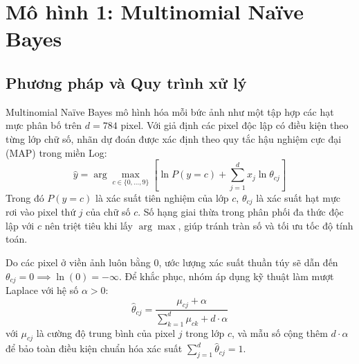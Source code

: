 \documentclass[11pt,a4paper]{article}
\begin{document}
\section{Mô hình 1: Multinomial Naïve Bayes}

\subsection{Phương pháp và Quy trình xử lý}
Multinomial Naïve Bayes mô hình hóa mỗi bức ảnh như một tập hợp các hạt mực phân bố trên $d = 784$ pixel. Với giả định các pixel độc lập có điều kiện theo từng lớp chữ số, nhãn dự đoán được xác định theo quy tắc hậu nghiệm cực đại (MAP) trong miền Log:
\begin{equation}
    \hat{y} = \arg\max_{c \in \{0, \dots, 9\}} \left[ \ln P(y = c) + \sum_{j=1}^d x_j \ln \theta_{cj} \right]
\end{equation}
Trong đó $P(y = c)$ là xác suất tiên nghiệm của lớp $c$, $\theta_{cj}$ là xác suất hạt mực rơi vào pixel thứ $j$ của chữ số $c$. Số hạng giai thừa trong phân phối đa thức độc lập với $c$ nên triệt tiêu khi lấy $\arg\max$, giúp tránh tràn số và tối ưu tốc độ tính toán.

Do các pixel ở viền ảnh luôn bằng 0, ước lượng xác suất thuần túy sẽ dẫn đến $\theta_{cj} = 0 \implies \ln(0) = -\infty$. Để khắc phục, nhóm áp dụng kỹ thuật làm mượt Laplace với hệ số $\alpha > 0$:
\begin{equation}
    \hat{\theta}_{cj} = \frac{\mu_{cj} + \alpha}{\sum_{k=1}^d \mu_{ck} + d \cdot \alpha}
\end{equation}
với $\mu_{cj}$ là cường độ trung bình của pixel $j$ trong lớp $c$, và mẫu số cộng thêm $d \cdot \alpha$ để bảo toàn điều kiện chuẩn hóa xác suất $\sum_{j=1}^d \hat{\theta}_{cj} = 1$.
\end{document}
